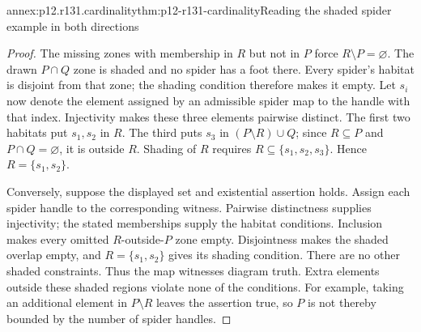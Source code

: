 \begin{annexitem}{annex:p12.r131.cardinality}{thm:p12-r131-cardinality}{Reading the shaded spider example in both directions}
\begin{proof}
The missing zones with membership in $R$ but not in $P$ force
$R\setminus P=\varnothing$. The drawn $P\cap Q$ zone is shaded
and no spider has a foot there. Every spider's habitat is disjoint
from that zone; the shading condition therefore makes it empty.
Let $s_i$ now denote the element assigned by an admissible spider
map to the handle with that index. Injectivity makes these three
elements pairwise distinct. The first two habitats put $s_1,s_2$
in $R$. The third puts $s_3$ in $(P\setminus R)\cup Q$;
since $R\subseteq P$ and $P\cap Q=\varnothing$, it is outside
$R$. Shading of $R$ requires $R\subseteq\{s_1,s_2,s_3\}$.
Hence $R=\{s_1,s_2\}$.

Conversely, suppose the displayed set and existential assertion
holds. Assign each spider handle to the corresponding witness.
Pairwise distinctness supplies injectivity; the stated memberships
supply the habitat conditions. Inclusion makes every omitted
$R$-outside-$P$ zone empty. Disjointness makes the shaded overlap
empty, and $R=\{s_1,s_2\}$ gives its shading condition. There
are no other shaded constraints. Thus the map witnesses diagram
truth. Extra elements outside these shaded regions violate none of
the conditions. For example, taking an additional element in
$P\setminus R$ leaves the assertion true, so $P$ is not thereby
bounded by the number of spider handles.
\end{proof}
\end{annexitem}

